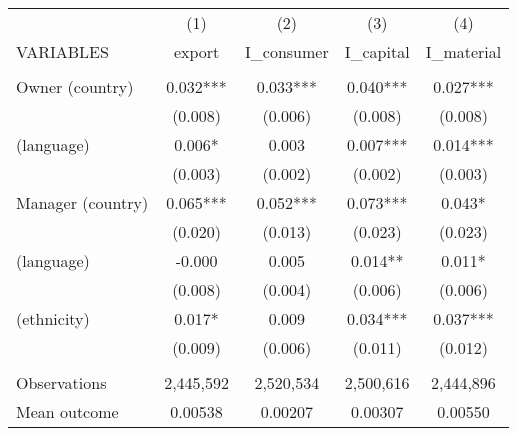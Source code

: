 \begin{tabular}{lcccc} \hline
 & (1) & (2) & (3) & (4) \\
VARIABLES & export & I\_consumer & I\_capital & I\_material \\ \hline
 &  &  &  &  \\
Owner (country) & 0.032*** & 0.033*** & 0.040*** & 0.027*** \\
 & (0.008) & (0.006) & (0.008) & (0.008) \\
(language) & 0.006* & 0.003 & 0.007*** & 0.014*** \\
 & (0.003) & (0.002) & (0.002) & (0.003) \\
Manager (country) & 0.065*** & 0.052*** & 0.073*** & 0.043* \\
 & (0.020) & (0.013) & (0.023) & (0.023) \\
(language) & -0.000 & 0.005 & 0.014** & 0.011* \\
 & (0.008) & (0.004) & (0.006) & (0.006) \\
(ethnicity) & 0.017* & 0.009 & 0.034*** & 0.037*** \\
 & (0.009) & (0.006) & (0.011) & (0.012) \\
 &  &  &  &  \\
Observations & 2,445,592 & 2,520,534 & 2,500,616 & 2,444,896 \\
 Mean outcome & 0.00538 & 0.00207 & 0.00307 & 0.00550 \\ \hline
\end{tabular}
